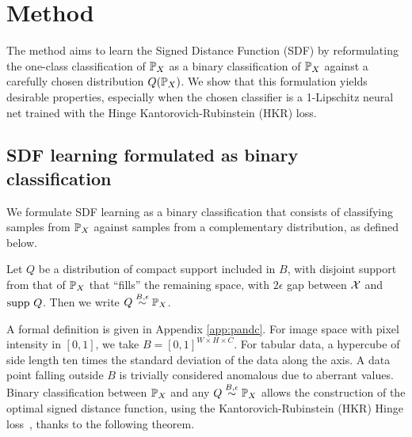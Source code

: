 
\section{Method}

The method aims to learn the Signed Distance Function (SDF) by reformulating the one-class classification of $\mathbb{P}_X$ as a binary classification of $\mathbb{P}_X$ against a carefully chosen distribution $Q(\mathbb{P}_X)$. We show that this formulation yields desirable properties, especially when the chosen classifier is a 1-Lipschitz neural net trained with the Hinge Kantorovich-Rubinstein (HKR) loss.
  
\subsection{SDF learning formulated as binary classification}

 We formulate SDF learning as a binary classification that consists of classifying samples from $\mathbb{P}_X$ against samples from a complementary distribution, as defined below. 

\begin{definition}\label{def:beddinformal}
Let $Q$ be a distribution of compact support included in $B$, with disjoint support from that of $\mathbb{P}_X$ that ``fills'' the remaining space, with $2\epsilon$ gap between $\mathcal{X}$ and $\text{supp }Q$. Then we write $Q\stackrel{B,\epsilon}{\sim}\mathbb{P}_X$. 
\end{definition}

A formal definition is given in Appendix \ref{app:pandc}. For image space with pixel intensity in $[0,1]$, we take $B=[0, 1]^{W\times H\times C}$. For tabular data, a hypercube of side length ten times the standard deviation of the data along the axis. A data point falling outside $B$ is trivially considered anomalous due to aberrant values.  Binary classification between $\mathbb{P}_X$ and any $Q\stackrel{B,\epsilon}{\sim}\mathbb{P}_X$ allows the construction of the optimal signed distance function, using the Kantorovich-Rubinstein (HKR) Hinge loss~\cite{serrurier2021achieving}, thanks to the following theorem.

